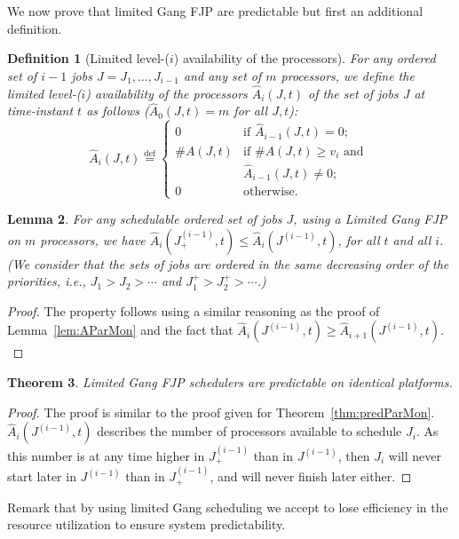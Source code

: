 \documentclass[a4paper]{article}
\newtheorem{theorem}{Theorem}
\newtheorem{definition}[theorem]{Definition}
\newtheorem{lemma}[theorem]{Lemma}
\newcommand{\equals}{\stackrel{\mathrm{def}}{=}}
\begin{document}
We now prove that limited Gang FJP are predictable but first an additional definition.

\begin{definition}[Limited level-($i$) availability of the processors]
For any ordered set of $i-1$ jobs $J=J_{1}, \ldots,J_{i-1}$ and any set of $m$ processors, we define the \emph{limited level-($i$) availability of the processors} $\hat{A}_{i}(J,t)$ of the set of jobs $J$ at time-instant $t$ as follows ($\hat{A}_{0}(J,t)= m$ for all $J,t$):
\[ \hat{A}_{i}(J,t) \equals \begin{cases} 
	0 			& \text{if $\hat{A}_{i-1}(J,t) = 0$};\\
	\#A(J,t) 	& \text{if }\#A(J,t)\geq v_{i} \text{ and } \\
		& \hat{A}_{i-1}(J,t) \neq 0;\\
 	0 & \text{otherwise.}
\end{cases}
\]
\end{definition}

\begin{lemma}\label{lem:ALimGang} 
For any schedulable ordered set of jobs $J$, using a Limited Gang FJP on $m$  processors, we have $\hat{A}_{i}(J^{(i-1)}_{+},t) \leq \hat{A}_{i}(J^{(i-1)},t)$, for all $t$ and all $i$. (We consider that the sets of jobs are ordered in the same decreasing order of the priorities, i.e., $J_1 > J_2 > \cdots$ and $J_1^{+} > J_2^{+} > \cdots$.)
\end{lemma}
\begin{proof}
The property follows using a similar reasoning as the proof of Lemma~\ref{lem:AParMon} and the fact that $\hat{A}_{i}(J^{(i-1)},t) \geq \hat{A}_{i+1}(J^{(i-1)},t).$
\end{proof}

\begin{theorem}\label{thm:predLimited}
Limited Gang FJP schedulers are predictable on identical platforms.
\end{theorem}

\begin{proof}
The proof is similar to the proof given for Theorem~\ref{thm:predParMon}. $\hat{A}_{i}(J^{(i-1)},t)$ describes the number of processors available to schedule $J_i$. As this number is at any time higher in $J_+^{(i-1)}$ than in $J^{(i-1)}$, then $J_i$ will never start later in  $J^{(i-1)}$ than in $J_+^{(i-1)}$, and will never finish later either.
\end{proof}

Remark that by using limited Gang scheduling we accept to lose efficiency in the resource utilization to ensure system predictability. 
 
\end{document}
